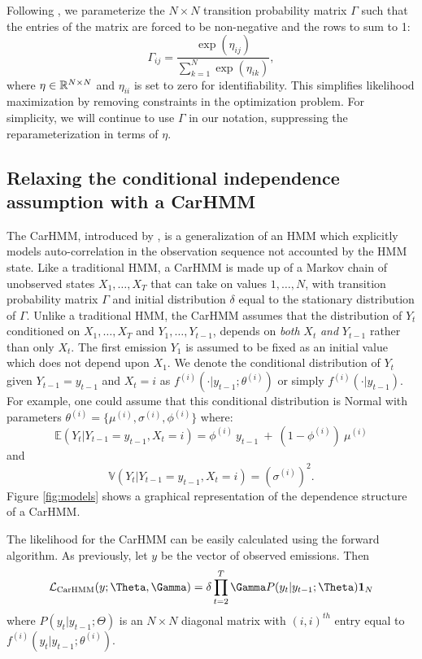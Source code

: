 Following \citet{Barajas:2017}, we parameterize the $N \times N$ transition probability matrix $\Gamma$ such that the entries of the matrix are forced to be non-negative and the rows to sum to 1:
%
\[
\Gamma_{ij} = \frac{\exp(\eta_{ij})}{\sum_{k=1}^N \exp(\eta_{ik})}, 
\]
%
where $\eta \in \mathbb{R}^{N \times N}$ and $\eta_{ii}$ is set to zero for identifiability. This simplifies likelihood maximization by removing constraints in the optimization problem. For simplicity, we will continue to use $\Gamma$ in our notation, suppressing the reparameterization in terms of $\eta$.


\subsection{Relaxing the conditional independence assumption with a CarHMM}

The CarHMM, introduced by \citet{Lawler:2019}, is a generalization of an HMM which explicitly models auto-correlation in the observation sequence not accounted by the HMM state. Like a traditional HMM, a CarHMM is made up of a Markov chain of unobserved states $X_1,\ldots, X_T$ that can take on values $1, \ldots, N$, with transition probability matrix $\Gamma$ and initial distribution $\delta$ equal to the stationary distribution of $\Gamma$. Unlike a traditional HMM, the CarHMM assumes that the distribution of $Y_t$ conditioned on $X_1,\ldots, X_T$ and $Y_1,\ldots, Y_{t-1}$, depends on \textit{both} $X_t$ \textit{and} $Y_{t-1}$ rather than only $X_t$. 
The first emission $Y_1$ is assumed to be fixed as an initial value which does not depend upon $X_1$.
%
We denote the conditional distribution of $Y_t$ given $Y_{t-1}= y_{t-1}$ and $X_t=i$ as $f^{(i)}( \cdot | y_{t-1}; \theta^{(i)})$ or simply $f^{(i)}( \cdot | y_{t-1})$.
For example, one could assume that this conditional distribution is Normal with parameters $\theta^{(i)} = \{\mu^{(i)},\sigma^{(i)},\phi^{(i)}\}$ where:
%
\[
\mathbb{E}(Y_t|Y_{t-1} = y_{t-1},X_t=i) = \phi^{(i)} ~ y_{t-1} ~+ ~(1-\phi^{(i)})  ~\mu^{(i)}
\]
and
\[
\mathbb{V}(Y_t| Y_{t-1} =y_{t-1}, X_t = i) = (\sigma^{(i)})^2.
\]
%
Figure \ref{fig:models} shows a graphical representation of the dependence structure of a CarHMM. 

The likelihood for the CarHMM can be easily calculated using the forward algorithm. As previously, let $y$ be the vector of observed emissions. Then
\begin{equation*}
    \calL_{\text{CarHMM}}(y;\Theta,\Gamma) = \delta \prod_{t=2}^T \Gamma P(y_t|y_{t-1};\Theta) \mathbf{1}_N
    \label{CarHMM_likelihood}
\end{equation*}
where
%
$P(y_t|y_{t-1};\Theta)$ is an $N \times N$ diagonal matrix with $(i,i)^{th}$ entry equal to $f^{(i)}(y_t|y_{t-1}; \theta^{(i)})$.

